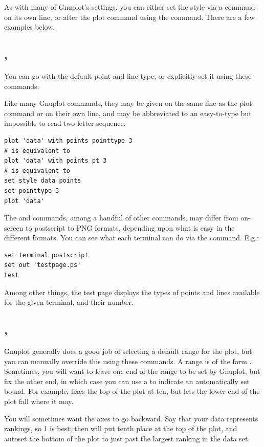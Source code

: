 As with many of Gnuplot's settings, you can either set the style via a
command on its own line, or after the plot command using the 
command. There are a few examples below.

\subsection{, } You can go with the default
point and line type, or explicitly set it using these commands.

Like many Gnuplot commands, they may be given on the same line as the
plot command or on their own line, and may be abbreviated to an
easy-to-type but impossible-to-read two-letter sequence.
\begin{lstlisting}
plot 'data' with points pointtype 3
# is equivalent to
plot 'data' with points pt 3
# is equivalent to
set style data points
set pointtype 3
plot 'data'
\end{lstlisting}

The  and  commands, among a handful of other
commands, may differ from on-screen to postscript
to PNG formats, depending upon what is easy in the different formats.  You can see what each terminal can do via the  command. E.g.:
\begin{lstlisting}
set terminal postscript
set out 'testpage.ps'
test
\end{lstlisting}
Among other things, the test page displays the types of points and lines
available for the given terminal, and their number.

\subsection{, } Gnuplot generally does a good job of
selecting a default range for the plot, but you can manually override
this using these commands. A range is of the form .
Sometimes, you will want to leave one end of the range to be set by
Gnuplot, but fix the other end, in which case you can use a \ci{*} to
indicate an automatically set bound. For example, 
fixes the top of the plot at ten, but lets the lower end of the plot
fall where it may. 

You will sometimes want the axes to go backward.  Say that your data
represents rankings, so 1 is best; then 
will put tenth place at the top of the plot, and autoset the bottom of
the plot to just past the largest ranking in the data set.

